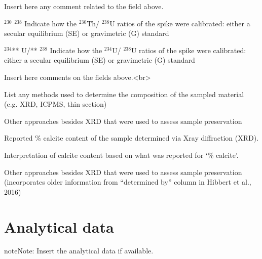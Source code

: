 \documentclass[letterpaper,10pt,english]{sphinxmanual}
\begin{document}
 \sphinxhyphen{} Insert here any comment related to the field above.

 $^{\text{230}}$ $^{\text{238}}$ \sphinxhyphen{} Indicate how the $^{\text{230}}$Th/ $^{\text{238}}$U ratios of the spike were calibrated: either a secular equilibrium (SE) or gravimetric (G) standard

 $^{\text{234}}$** U/** $^{\text{238}}$ \sphinxhyphen{} Indicate how the $^{\text{234}}$U/ $^{\text{238}}$U ratios of the spike were calibrated: either a secular equilibrium (SE) or gravimetric (G) standard

 \sphinxhyphen{} Insert here comments on the fields above.\textless{}br\textgreater{}

 \sphinxhyphen{} List any methods used to determine the composition of the sampled material (e.g. XRD, ICP\sphinxhyphen{}MS, thin section)

 \sphinxhyphen{} Other approaches besides XRD that were used to assess sample preservation

  \sphinxhyphen{} Reported \% calcite content of the sample determined via X\sphinxhyphen{}ray diffraction (XRD).

  \sphinxhyphen{} Interpretation of calcite content based on what was reported for ‘\% calcite’.

 \sphinxhyphen{} Other approaches besides XRD that were used to assess sample preservation (incorporates older information from “determined by” column in Hibbert et al., 2016)


\section{Analytical data}
\label{\detokenize{Useries:analytical-data}}
\begin{sphinxadmonition}{note}{Note:}
Insert the analytical data if available.
\end{sphinxadmonition}
\end{document}
